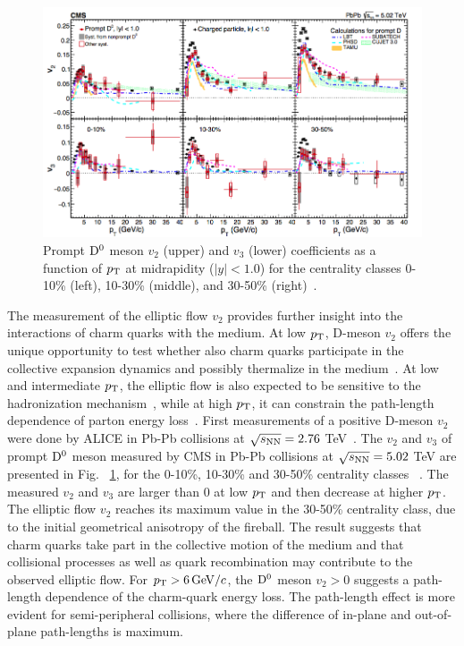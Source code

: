 \begin{figure}[!ht]
  \centering
        \includegraphics[width=14cm]{FigCap2/D0v2_CMS_5TeV.png}
  \caption{Prompt ${\rm D^0}$ meson $v_2$ (upper) and $v_3$ (lower) coefficients as a function of $p_{\rm T}$ at midrapidity ($|y| < 1.0$) for
the centrality classes 0-10\% (left), 10-30\% (middle), and 30-50\% (right)~\cite{Sirunyan:2017plt}.}
  \label{fig:D0v2CMS}
\end{figure}



The measurement of the elliptic flow $v_2$ provides further 
insight into the interactions of charm quarks with the medium. 
At low $p_{\rm T}$, D-meson $v_2$ offers the unique opportunity 
to test whether also charm quarks participate in the collective 
expansion dynamics and possibly thermalize in the medium~\cite{Greco:2003vf,Ollitrault:1992bk}. 
At low and intermediate $p_{\rm T}$, the elliptic flow is also expected to 
be sensitive to the hadronization mechanism~\cite{Greco:2003vf}, while at high $p_{\rm T}$, 
it can constrain the path-length dependence of parton energy loss~\cite{Gyulassy:2000gk}.
First measurements of a positive D-meson $v_2$ were done by ALICE
in Pb-Pb collisions at $\sqrt{s_{\rm NN}} = 2.76$ TeV~\cite{Abelev:2014ipa}.
The $v_2$ and $v_3$ of prompt ${\rm D^0}$ meson measured by CMS 
in Pb-Pb collisions at $\sqrt{s_{\rm NN}} = 5.02 $ TeV are presented in 
Fig.~	\ref{fig:D0v2CMS}, for the 0-10\%, 
10-30\% and 30-50\% centrality classes ~\cite{Sirunyan:2017plt}. 
The measured $v_2$ and $v_3$ are larger than 0 
at low $p_{\rm T}$ and then decrease at higher $p_{\rm T}$.
The elliptic flow $v_2$ reaches its maximum value in the 30-50\% centrality class,
due to the initial geometrical anisotropy of the fireball.
The result suggests that charm quarks take part in 
the collective motion of the medium and that collisional processes as well as quark 
recombination may contribute to the observed elliptic flow. 
For $p_{\rm T} > 6\, \mathrm{GeV}/c$, the ${\rm D^0}$ meson $v_2 >0$ suggests a 
path-length dependence of the charm-quark energy loss. 
The path-length effect is more evident for semi-peripheral collisions, where the difference of
in-plane and out-of-plane path-lengths is maximum.\\



